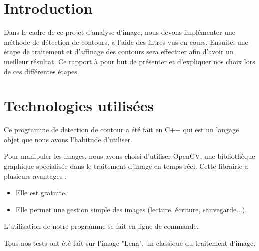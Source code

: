 \documentclass[11pt]{article}
\author{\fontsize{14}{14}{Aurélien CHEMIER 10908892 et Romane LHOMME 11006689}}
\title{\fontsize{16}{16}{{\bf Analyse, aquisition et traitement d’image \\ TP1}}}
\date{\fontsize{11}{11}{\today}}
\begin{document}
\thispagestyle{empty}
\maketitle

\newpage

\section{Introduction}

	Dans le cadre de ce projet d’analyse d’image, nous devons implémenter une méthode de détection de contours, à l’aide des filtres vus en cours. 
	Ensuite, une étape de traitement et d'affinage des contours  sera effectuer afin d'avoir un meilleur résultat.
	Ce rapport à pour but de présenter et d'expliquer nos choix lors de ces différentes étapes.

	\section{Technologies utilisées}

	Ce programme de detection de contour a été fait en C++ qui est un langage objet que nous avons l'habitude d'utiliser.

	Pour manipuler les images, nous avons choisi d'utiliser OpenCV, une bibliothèque graphique spécialisée dans le traitement d'image en temps réel.
	Cette librairie a plusieurs avantages :
	\begin{itemize}
		\item Elle est gratuite.
		\item Elle permet une gestion simple des images (lecture, écriture, sauvegarde...).
	\end{itemize}

	L'utilisation de notre programme se fait en ligne de commande.

	Tous nos tests ont été fait sur l'image "Lena", un classique du traitement d'image.
\end{document}
